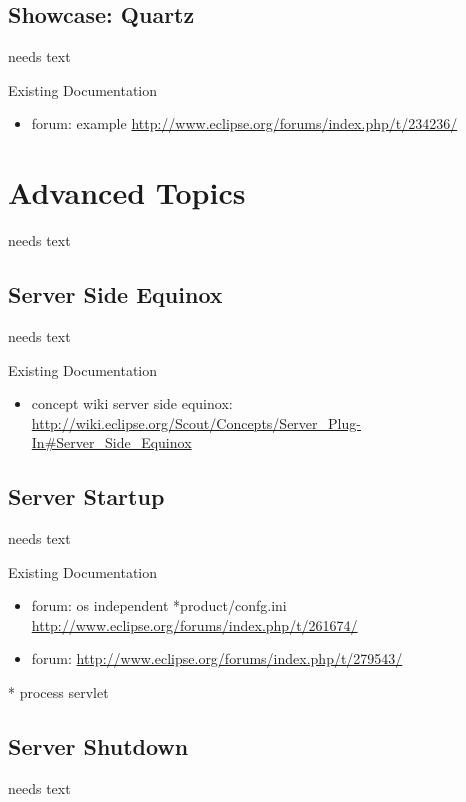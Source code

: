 \documentclass[a4paper,10pt,twoside]{book}
\begin{document}
\section{Showcase: Quartz}
needs text

\noindent Existing Documentation
\begin{itemize}
  \item forum: example \url{http://www.eclipse.org/forums/index.php/t/234236/}
\end{itemize}

\chapter{Advanced Topics}
needs text

\section{Server Side Equinox}
needs text

\noindent Existing Documentation
\begin{itemize}
  \item concept wiki server side equinox: \url{http://wiki.eclipse.org/Scout/Concepts/Server_Plug-In#Server_Side_Equinox}
\end{itemize}

\section{Server Startup}
needs text

\noindent Existing Documentation
\begin{itemize}
  \item forum: os independent *product/confg.ini \url{http://www.eclipse.org/forums/index.php/t/261674/}
  \item forum: \url{http://www.eclipse.org/forums/index.php/t/279543/}
\end{itemize}

  * process servlet

\section{Server Shutdown}
needs text
\end{document}

